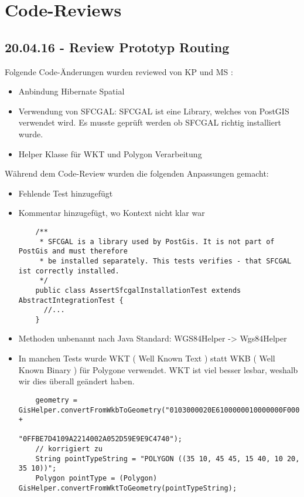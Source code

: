 \newpage
\chapter{Code-Reviews} 

\section{20.04.16 - Review Prototyp Routing}
Folgende Code-Änderungen wurden reviewed von KP und MS :
\begin{itemize}
	\item{Anbindung Hibernate Spatial}
	\item{Verwendung von SFCGAL: SFCGAL ist eine Library, welches von PostGIS verwendet wird. Es musste geprüft werden ob SFCGAL richtig installiert wurde.}
	\item{Helper Klasse für WKT und Polygon Verarbeitung}
\end{itemize}

Während dem Code-Review wurden die folgenden Anpassungen gemacht:
\begin{itemize}
	\item{Fehlende Test hinzugefügt}
	\item{Kommentar hinzugefügt, wo Kontext nicht klar war}
	\begin{lstlisting}
	/**
     * SFCGAL is a library used by PostGis. It is not part of PostGis and must therefore
     * be installed separately. This tests verifies - that SFCGAL ist correctly installed.
     */
    public class AssertSfcgalInstallationTest extends AbstractIntegrationTest {
      //...
    }
	\end{lstlisting}
	\item{Methoden unbenannt nach Java Standard: WGS84Helper -> Wgs84Helper }
	\item{In manchen Tests wurde WKT ( Well Known Text ) statt WKB ( Well Known Binary ) für Polygone verwendet. WKT ist viel besser lesbar, weshalb wir dies überall geändert haben.}
	\begin{lstlisting}
    geometry = GisHelper.convertFromWkbToGeometry("0103000020E6100000010000000F00000" +
                                                  "0FFBE7D4109A2214002A052D59E9E9C4740");
    // korrigiert zu
    String pointTypeString = "POLYGON ((35 10, 45 45, 15 40, 10 20, 35 10))";
    Polygon pointType = (Polygon) GisHelper.convertFromWktToGeometry(pointTypeString);
	\end{lstlisting}
\end{itemize}
\newpage

